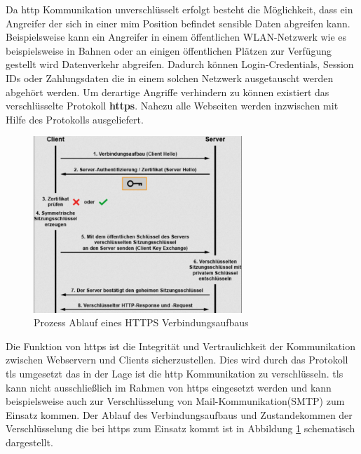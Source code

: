 




Da \ac{http} Kommunikation unverschlüsselt erfolgt besteht die Möglichkeit, dass ein Angreifer der sich in einer \ac{mim} Position befindet sensible Daten abgreifen kann.
Beispielsweise kann ein Angreifer in einem öffentlichen WLAN-Netzwerk wie es beispielsweise in Bahnen oder an einigen öffentlichen Plätzen zur Verfügung gestellt wird Datenverkehr abgreifen.
Dadurch können Login-Credentials, Session IDs oder Zahlungsdaten die in einem solchen Netzwerk ausgetauscht werden abgehört werden.
Um derartige Angriffe verhindern zu können existiert das verschlüsselte Protokoll \textbf{\ac{https}}.
Nahezu alle Webseiten werden inzwischen mit Hilfe des Protokolls ausgeliefert.

\begin{figure}[!hbt]
    \centering
    \includegraphics[width=0.7\textwidth]{./images/HTTPS-Processflow.png}
    \caption{Prozess Ablauf eines HTTPS Verbindungsaufbaus}
    \label{fig:https-porcess-flow}
\end{figure}

Die Funktion von \ac{https} ist die Integrität und Vertraulichkeit der Kommunikation zwischen Webservern und Clients sicherzustellen.
Dies wird durch das Protokoll \ac{tls} umgesetzt das in der Lage ist die \ac{http} Kommunikation zu verschlüsseln.
\ac{tls} kann nicht ausschließlich im Rahmen von \ac{https} eingesetzt werden und kann beispielsweise auch zur Verschlüsselung von Mail-Kommunikation(SMTP) zum Einsatz kommen.
Der Ablauf des Verbindungsaufbaus und Zustandekommen der Verschlüsselung die bei \ac{https} zum Einsatz kommt ist in Abbildung \ref{fig:https-porcess-flow} schematisch dargestellt.

